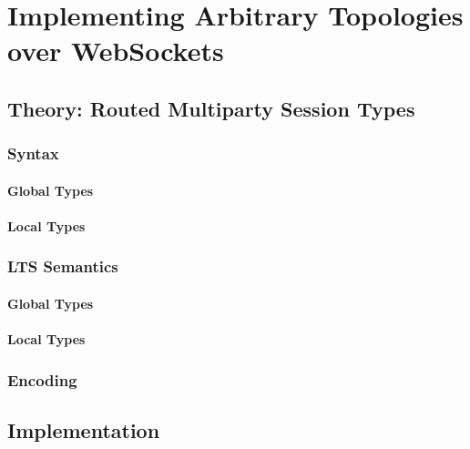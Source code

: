 \part{Implementing Arbitrary Topologies over WebSockets}

\chapter{Theory: Routed Multiparty Session Types}

\section{Syntax}

\subsection{Global Types}

\subsection{Local Types}

\section{LTS Semantics}

\subsection{Global Types}

\subsection{Local Types}

\section{Encoding}

\chapter{Implementation}
